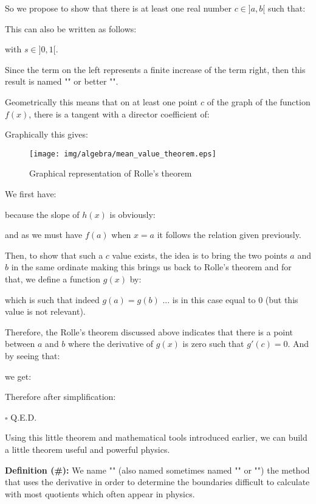 \begin{theorem}
	So we propose to show that there is at least one real number $c \in ]a,b[ $ such that:
	
This can also be written as follows:
	
with $s\in ]0,1[.$

Since the term on the left represents a finite increase of the term right, then this result is named "" or better "".

Geometrically this means that on at least one point $c$ of the graph of the function $f (x)$, there is a tangent with a director coefficient of:
	
Graphically this gives:
\begin{figure}[H]
\centering
\texttt{[image: img/algebra/mean\_value\_theorem.eps]}
\caption{Graphical representation of Rolle's theorem}
\end{figure}

\end{theorem}
\begin{dem}
	We first have:
	
	because the slope of $h(x)$ is obviously:
		
 and as we must have $f(a)$ when $x=a$ it follows the relation given previously.

Then, to show that such a $c$ value exists, the idea is to bring the two points $a$ and $b$ in the same ordinate making this brings us back to Rolle's theorem and for that, we define a function $g(x)$ by:
	
which is such that indeed $g(a)=g(b)$ ... is in this case equal to $0$ (but this value is not relevant).

Therefore, the Rolle's theorem discussed above indicates that there is a point between $a$ and $b$ where the derivative of $g(x)$ is zero such that $g'(c)=0$. And by seeing that:
	
we get:
	
	Therefore after simplification:
		
		\begin{flushright}
			$\square$  Q.E.D.
		\end{flushright}
\end{dem}
Using this little theorem and mathematical tools introduced earlier, we can build a little theorem useful and powerful physics.

\textbf{Definition (\#\mydef):} We name  "" (also named sometimes named "" or "\label{Hospital rule}") the method that uses the derivative in order to determine the boundaries difficult to calculate with most quotients which often appear in physics.

